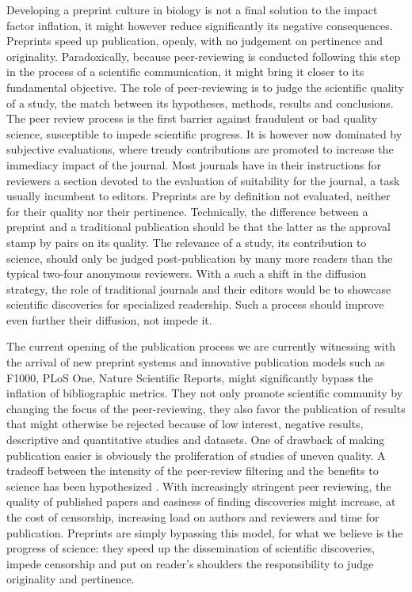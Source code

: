\documentclass[letterpaper,twocolumn,superscriptaddress,showkeys,longbibliography]{revtex4-1}
\begin{document}
Developing a preprint culture in biology is not a final solution to the impact factor inflation, it might however reduce significantly its negative consequences. Preprints speed up publication, openly, with no judgement on pertinence and originality. Paradoxically, because peer-reviewing is conducted following this step in the process of a scientific communication, it might bring it closer to its fundamental objective. The role of peer-reviewing is to judge the scientific quality of a study, the match between its hypotheses, methods, results and conclusions. The peer review process is the first barrier against fraudulent or bad quality science, susceptible to impede scientific progress. It is however now dominated by subjective evaluations, where trendy contributions are promoted to increase the immediacy impact of the journal. Most journals have in their instructions for reviewers a section devoted to the evaluation of suitability for the journal, a task usually incumbent to editors. Preprints are by definition not evaluated, neither for their quality nor their pertinence. Technically, the difference between a preprint and a traditional publication should be that the latter as the approval stamp by pairs on its quality. The relevance of a study, its contribution to science, should only be judged post-publication by many more readers than the typical two-four anonymous reviewers. With a such a shift in the diffusion strategy, the role of traditional journals and their editors would be to showcase scientific discoveries for specialized readership. Such a process should improve even further their diffusion, not impede it. 

The current opening of the publication process we are currently witnessing with the arrival of new preprint systems and innovative publication models such as F1000, PLoS One, Nature Scientific Reports, might significantly bypass the inflation of bibliographic metrics. They not only promote scientific community by changing the focus of the peer-reviewing, they also favor the publication of results that might otherwise be rejected because of low interest, negative results, descriptive and quantitative studies and datasets. One of drawback of making publication easier is obviously the proliferation of studies of uneven quality. A tradeoff between the intensity of the peer-review filtering and the benefits to science has been hypothesized \cite{Aarssen2012}. With increasingly stringent peer reviewing, the quality of published papers and easiness of finding discoveries might increase, at the cost of censorship, increasing load on authors and reviewers and time for publication. Preprints are simply bypassing this model, for what we believe is the progress of science: they speed up the dissemination of scientific discoveries, impede censorship and put on reader's shoulders the responsibility to judge originality and pertinence.
\end{document}
